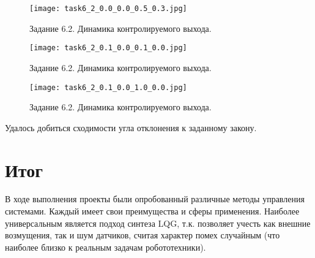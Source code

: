\begin{figure}[]
    \centering
    \texttt{[image: task6\_2\_0.0\_0.0\_0.5\_0.3.jpg]}
    \caption{Задание 6.2. Динамика контролируемого выхода.}
    \label{fig:task6_1}
\end{figure}
\begin{figure}[]
    \centering
    \texttt{[image: task6\_2\_0.1\_0.0\_0.1\_0.0.jpg]}
    \caption{Задание 6.2. Динамика контролируемого выхода.}
    \label{fig:task6_1}
\end{figure}
\begin{figure}[]
    \centering
    \texttt{[image: task6\_2\_0.1\_0.0\_1.0\_0.0.jpg]}
    \caption{Задание 6.2. Динамика контролируемого выхода.}
    \label{fig:task6_1}
\end{figure}
Удалось добиться сходимости угла отклонения к заданному закону.

\pagebreak
\section{Итог}
В ходе выполнения проекты были опробованный различные методы управления системами. Каждый имеет свои преимущества и сферы применения. Наиболее универсальным является подход синтеза LQG, т.к. позволяет учесть как внешние возмущения, так и шум датчиков, считая характер помех случайным (что наиболее близко к реальным задачам робототехники).